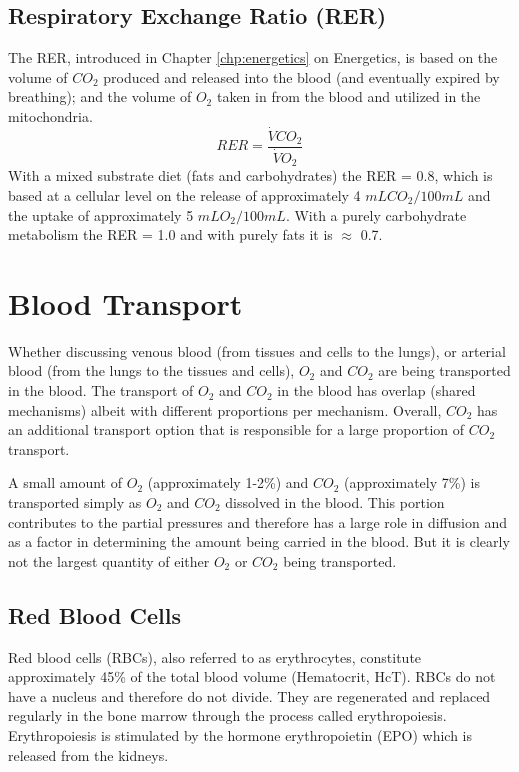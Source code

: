 \subsection{Respiratory Exchange Ratio (RER)}

The RER, introduced in Chapter \ref{chp:energetics} on Energetics, is based on the volume of $CO_2$ produced and released into the blood (and eventually expired by breathing); and the volume of $O_2$ taken in from the blood and utilized in the mitochondria. 
\begin{equation}
    RER = \frac{\dot{V}CO_2}{\dot{V}O_2}
\end{equation}
With a mixed substrate diet (fats and carbohydrates) the RER = 0.8, which is based at a cellular level on the release of approximately 4 $mL CO_2 / 100 mL$ and the uptake of approximately 5 $mL O_2 / 100 mL$. With a purely carbohydrate metabolism the RER = 1.0 and with purely fats it is $\approx$ 0.7. 



\section{Blood Transport}

Whether discussing venous blood (from tissues and cells to the lungs), or arterial blood (from the lungs to the tissues and cells), $O_2$ and $CO_2$ are being transported in the blood. The transport of $O_2$ and $CO_2$ in the blood has overlap (shared mechanisms) albeit with different proportions per mechanism. Overall, $CO_2$ has an additional transport option that is responsible for a large proportion of $CO_2$ transport.

A small amount of $O_2$ (approximately 1-2\%) and $CO_2$ (approximately 7\%) is transported simply as $O_2$ and $CO_2$ dissolved in the blood. This portion contributes to the partial pressures and therefore has a large role in diffusion and as a factor in determining the amount being carried in the blood. But it is clearly not the largest quantity of either $O_2$ or $CO_2$ being transported.

\subsection{Red Blood Cells}

Red blood cells (RBCs), also referred to as erythrocytes, constitute approximately 45\% of the total blood volume (Hematocrit, HcT). RBCs do not have a nucleus and therefore do not divide. They are regenerated and replaced regularly in the bone marrow through the process called erythropoiesis. Erythropoiesis is stimulated by the hormone erythropoietin (EPO) which is released from the kidneys.

